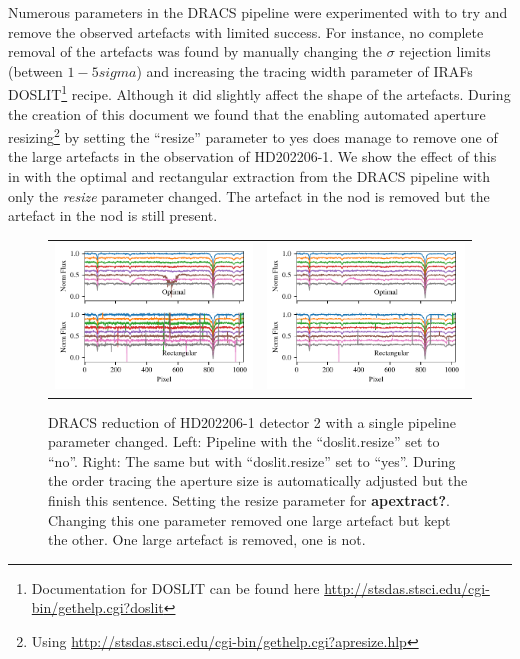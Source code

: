 Numerous parameters in the {DRACS} pipeline were experimented with to try and remove the observed artefacts with limited success. For instance, no complete removal of the artefacts was found by manually changing the \(\sigma\) rejection limits (between \(1-5 sigma\)) and increasing the tracing width parameter of {IRAF}s DOSLIT\footnote{Documentation for DOSLIT can be found here \href{http://stsdas.stsci.edu/cgi-bin/gethelp.cgi?doslit}{http://stsdas.stsci.edu/cgi-bin/gethelp.cgi?doslit}} recipe. Although it did slightly affect the shape of the artefacts.
During the creation of this document we found that the enabling automated aperture resizing\footnote{Using \href{apresize}{http://stsdas.stsci.edu/cgi-bin/gethelp.cgi?apresize.hlp}} by setting the ``resize'' parameter to yes does manage to remove one of the large artefacts in the observation of {HD202206-1}. We show the effect of this in  with the optimal and rectangular extraction from the {DRACS} pipeline with only the \emph{resize} parameter changed. The artefact in the  nod is removed but the artefact in the  nod is still present.
\begin{figure}
    \centering
    \begin{tabular}{cc}
    \includegraphics[width=0.5\linewidth]{figures/reduction/bp_plots/non_resized_nods_HD202206-1_chip_2} & \includegraphics[width=0.5\linewidth]{figures/reduction/bp_plots/resized_nods_HD202206-1_chip_2}\\
    \end{tabular}
    \caption{{DRACS} reduction of HD202206-1 detector 2 with a single pipeline parameter changed. Left: Pipeline with the ``doslit.resize'' set to ``no''. Right: The same but with ``doslit.resize'' set to ``yes''. During the order tracing the aperture size is automatically adjusted but the {\red{} finish this sentence}. Setting the resize parameter for \textbf{apextract?}. Changing this one parameter removed one large artefact but kept the other. One large artefact is removed, one is not.}
    \label{fig:resizednods}
\end{figure}

